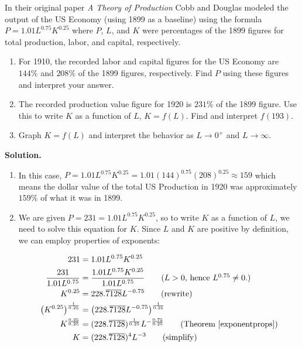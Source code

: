 \begin{ex} \label{CobbDouglasEx}  In their original paper \textit{A Theory of Production} Cobb and Douglas modeled the output of the US Economy (using 1899 as a baseline) using the formula $P = 1.01 L^{0.75} K^{0.25}$ where $P$, $L$, and $K$ were percentages of the 1899 figures for total production, labor, and capital, respectively.

\begin{enumerate}

\item  For 1910, the recorded labor and capital figures for the US Economy are $144 \%$ and $208 \%$ of the 1899 figures, respectively.  Find $P$ using these figures and interpret your answer.

\item  The recorded production value figure for 1920 is $231 \%$ of the 1899 figure.  Use this to write $K$ as a function of $L$, $K = f(L)$.  Find and interpret $f(193)$.

\item  Graph $K = f(L)$ and interpret the behavior as $L \rightarrow 0^{+}$ and $L \rightarrow \infty$.


\end{enumerate}

{\bf Solution.}

\begin{enumerate}

\item  In this case, $P = 1.01 L^{0.75} K^{0.25} = 1.01 (144)^{0.75} (208)^{0.25} \approx 159$ which means the dollar value of the total US Production in 1920 was approximately $159 \%$ of what it was in 1899.  

\item We are given $P = 231 = 1.01L^{0.75} K^{0.25}$, so to write $K$ as a function of $L$, we need to solve this equation for $K$.  Since $L$ and $K$ are positive by definition, we can employ properties of exponents:

\begin{align*}
231 & = 1.01 L^{0.75} K^{0.25} \\
\dfrac{231}{1.01 L^{0.75}} & = \dfrac{1.01 L^{0.75} K^{0.25}}{1.01 L^{0.75}} \tag{$L>0$, hence $L^{0.75} \neq 0$.}\\
K^{0.25} & = 228.\overline{7128}L^{-0.75} \tag{rewrite} \\
\left(K^{0.25}\right)^{\frac{1}{0.25}} & = \left(228.\overline{7128}L^{-0.75}\right)^{\frac{1}{0.25}} \\
K^{\frac{0.25}{0.25}} & = (228.\overline{7128})^{\frac{1}{0.25}} L^{-\frac{0.75}{0.25}} \tag{Theorem  \ref{exponentprops}} \\
K & = (228.\overline{7128})^{4} L^{-3} \tag{simplify}
\end{align*}


\end{enumerate}
\end{ex}
